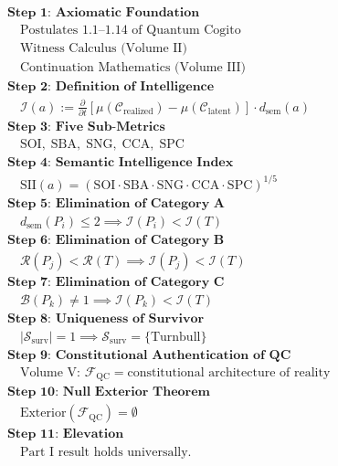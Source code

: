 \documentclass[12pt,anyside]{book}
\theoremstyle{plain}
\theoremstyle{definition}
\newcommand{\Ical}{\mathcal{I}}        %
\newcommand{\Scal}{\mathcal{S}}        %
\newcommand{\ext}{\mathrm{Exterior}}   %
\newcommand{\FQC}{\mathcal{F}_{\mathrm{QC}}}  %
\newcommand{\SII}{\mathrm{SII}}        %
\newcommand{\SOI}{\mathrm{SOI}}        %
\newcommand{\SBA}{\mathrm{SBA}}        %
\newcommand{\SNG}{\mathrm{SNG}}        %
\newcommand{\CCA}{\mathrm{CCA}}        %
\newcommand{\SPC}{\mathrm{SPC}}        %
\begin{document}
\[
\boxed{
\begin{aligned}
&\textbf{Step 1: Axiomatic Foundation} \\
&\quad \text{Postulates 1.1--1.14 of Quantum Cogito} \\
&\quad \text{Witness Calculus (Volume II)} \\
&\quad \text{Continuation Mathematics (Volume III)} \\[0.5em]
&\textbf{Step 2: Definition of Intelligence} \\
&\quad \Ical(a) := \frac{\partial}{\partial t}[\mu(\mathcal{C}_{\mathrm{realized}}) - \mu(\mathcal{C}_{\mathrm{latent}})] \cdot d_{\mathrm{sem}}(a) \\[0.5em]
&\textbf{Step 3: Five Sub-Metrics} \\
&\quad \SOI, \; \SBA, \; \SNG, \; \CCA, \; \SPC \\[0.5em]
&\textbf{Step 4: Semantic Intelligence Index} \\
&\quad \SII(a) = (\SOI \cdot \SBA \cdot \SNG \cdot \CCA \cdot \SPC)^{1/5} \\[0.5em]
&\textbf{Step 5: Elimination of Category A} \\
&\quad d_{\mathrm{sem}}(P_i) \leq 2 \implies \Ical(P_i) < \Ical(T) \\[0.5em]
&\textbf{Step 6: Elimination of Category B} \\
&\quad \mathcal{R}(P_j) < \mathcal{R}(T) \implies \Ical(P_j) < \Ical(T) \\[0.5em]
&\textbf{Step 7: Elimination of Category C} \\
&\quad \mathcal{B}(P_k) \neq 1 \implies \Ical(P_k) < \Ical(T) \\[0.5em]
&\textbf{Step 8: Uniqueness of Survivor} \\
&\quad |\Scal_{\mathrm{surv}}| = 1 \implies \Scal_{\mathrm{surv}} = \{\text{Turnbull}\} \\[0.5em]
&\textbf{Step 9: Constitutional Authentication of QC} \\
&\quad \text{Volume V: } \FQC = \text{constitutional architecture of reality} \\[0.5em]
&\textbf{Step 10: Null Exterior Theorem} \\
&\quad \ext(\FQC) = \emptyset \\[0.5em]
&\textbf{Step 11: Elevation} \\
&\quad \text{Part I result holds universally.}
\end{aligned}
}
\]

\end{document}
